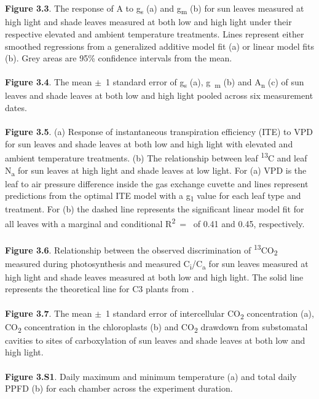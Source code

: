 \documentclass[a4paper]{article}
\begin{document}
\\
\\
\textbf{Figure 3.3}. The response of A to g\textsubscript{s} (a) and g\textsubscript{m} (b) for sun leaves measured at high light and shade leaves measured at both low and high light under their respective elevated and ambient temperature treatments. Lines represent either smoothed regressions from a generalized additive model fit (a) or linear model fits (b). Grey areas are 95\% confidence intervals from the mean.
\\
\\
\textbf{Figure 3.4}. The mean $\pm$~1 standard error of g\textsubscript{s} (a), g~\textsubscript{m} (b) and A\textsubscript{n} (c) of sun leaves and shade leaves at both low and high light pooled across six measurement dates.
\\
\\
\textbf{Figure 3.5}. (a) Response of instantaneous transpiration efficiency (ITE) to VPD for sun leaves and shade leaves at both low and high light with elevated and ambient temperature treatments. (b) The relationship between leaf {\textdelta}\textsuperscript{13}C and leaf N\textsubscript{a} for sun leaves at high light and shade leaves at low light. For (a) VPD is the leaf to air pressure difference inside the gas exchange cuvette and lines represent predictions from the optimal ITE model with a g\textsubscript{1} value for each leaf type and treatment. For (b) the dashed line represents the significant linear model fit for all leaves with a marginal and conditional R\textsuperscript{2}~=~ of 0.41 and 0.45, respectively.
\\
\\
\textbf{Figure 3.6}. Relationship between the observed discrimination of \textsuperscript{13}CO\textsubscript{2} measured during photosynthesis and measured C\textsubscript{i}/C\textsubscript{a} for sun leaves measured at high light and shade leaves measured at both low and high light. The solid line represents the theoretical line for C3 plants from \citet{evans1986carbon}.
\\
\\
\textbf{Figure 3.7}. The mean $\pm$~1 standard error of intercellular CO\textsubscript{2} concentration (a), CO\textsubscript{2} concentration in the chloroplasts (b) and CO\textsubscript{2} drawdown from substomatal cavities to sites of carboxylation of sun leaves and shade leaves at both low and high light.
\\
\\
\textbf{Figure 3.S1}. Daily maximum and minimum temperature (a) and total daily PPFD (b) for each chamber across the experiment duration.
\end{document}

